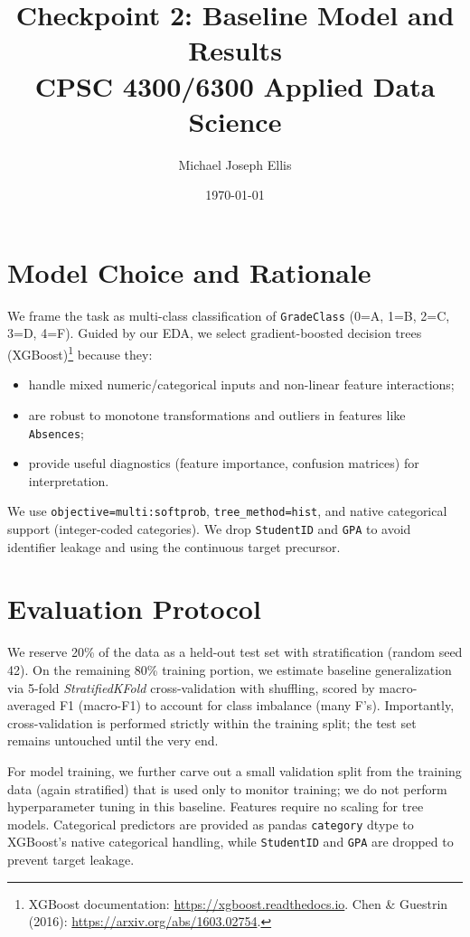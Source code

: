 \documentclass[11pt]{article}
\title{Checkpoint 2: Baseline Model and Results\\CPSC 4300/6300 Applied Data Science}
\author{Michael Joseph Ellis}
\date{\today}
\begin{document}
\maketitle

\section*{Model Choice and Rationale}
We frame the task as multi-class classification of \texttt{GradeClass} (0=A, 1=B, 2=C, 3=D, 4=F). Guided by our EDA, we select gradient-boosted decision trees (XGBoost)\footnote{XGBoost documentation: \url{https://xgboost.readthedocs.io}. Chen \& Guestrin (2016): \url{https://arxiv.org/abs/1603.02754}.} because they:
\begin{itemize}[leftmargin=*]
  \item handle mixed numeric/categorical inputs and non-linear feature interactions;
  \item are robust to monotone transformations and outliers in features like \texttt{Absences};
  \item provide useful diagnostics (feature importance, confusion matrices) for interpretation.
\end{itemize}
We use \texttt{objective=multi:softprob}, \texttt{tree\_method=hist}, and native categorical support (integer-coded categories). We drop \texttt{StudentID} and \texttt{GPA} to avoid identifier leakage and using the continuous target precursor.

\section*{Evaluation Protocol}
We reserve 20\% of the data as a held-out test set with stratification (random seed 42). On the remaining 80\% training portion, we estimate baseline generalization via 5-fold \emph{StratifiedKFold} cross-validation with shuffling, scored by macro-averaged F1 (macro-F1) to account for class imbalance (many F's). Importantly, cross-validation is performed strictly within the training split; the test set remains untouched until the very end.

For model training, we further carve out a small validation split from the training data (again stratified) that is used only to monitor training; we do not perform hyperparameter tuning in this baseline. Features require no scaling for tree models. Categorical predictors are provided as pandas \texttt{category} dtype to XGBoost's native categorical handling, while \texttt{StudentID} and \texttt{GPA} are dropped to prevent target leakage.
\end{document}
